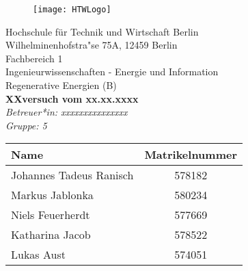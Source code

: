\begin{titlepage}

		\begin{figure}[h] 
				\begin{flushright}
			\texttt{[image: HTWLogo]}\\
				\end{flushright}
		\end{figure}
		
	\begin{center}
		\vspace*{\fill}
		{\Large Hochschule f{\"u}r Technik und Wirtschaft Berlin}\\
			\bigskip
			Wilhelminenhofstra"se 75A, 12459 Berlin\\
			\bigskip
		Fachbereich 1 \\Ingenieurwissenschaften - Energie und Information\\Regenerative Energien (B)\\
		\vfill
		 \textcolor{HTWGreen}{\textbf{\Large{XXversuch vom xx.xx.xxxx}}}\\
		\textit{Betreuer*in: xxxxxxxxxxxxxxx}\\
		\textit{Gruppe: 5}\\
	\vfill
	\end{center}
\vfill
\begin{table}[H]
			\centering
			\begin{tabular}{|l|c|}
			\hline
			\rowcolor[cmyk]{0.55, 0.00, 1.00, 0.00} \textbf{Name} & \textbf{Matrikelnummer}  \\
			\hline
			Johannes Tadeus Ranisch     & 578182\\
			\hline
			Markus Jablonka       & 580234\\
			\hline
			Niels Feuerherdt      & 577669\\
			\hline
			Katharina Jacob			 & 578522\\
			\hline
			Lukas Aust			 & 574051\\
			\hline
			\end{tabular}
			\end{table}
\end{titlepage}
